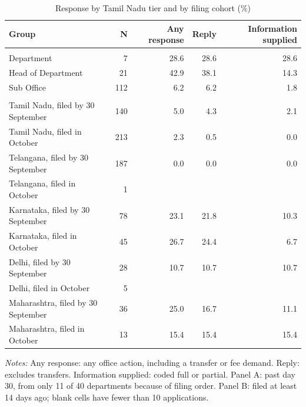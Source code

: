 \begin{table}[!htbp]
\centering
\caption{Response by Tamil Nadu tier and by filing cohort (\%)}
\label{tab:tab_cuts}
\small
\begin{threeparttable}
\begin{tabular}{lrrrr}
\toprule
Group & N & Any response & Reply & Information supplied \\
\midrule
\addlinespace\multicolumn{5}{l}{\textit{Panel A. Tamil Nadu by tier, by day 30}} \\
Department & 7 & 28.6 & 28.6 & 28.6 \\
Head of Department & 21 & 42.9 & 38.1 & 14.3 \\
Sub Office & 112 & 6.2 & 6.2 & 1.8 \\
\addlinespace\multicolumn{5}{l}{\textit{Panel B. By filing cohort, by day 14}} \\
Tamil Nadu, filed by 30 September & 140 & 5.0 & 4.3 & 2.1 \\
Tamil Nadu, filed in October & 213 & 2.3 & 0.5 & 0.0 \\
Telangana, filed by 30 September & 187 & 0.0 & 0.0 & 0.0 \\
Telangana, filed in October & 1 &  &  &  \\
Karnataka, filed by 30 September & 78 & 23.1 & 21.8 & 10.3 \\
Karnataka, filed in October & 45 & 26.7 & 24.4 & 6.7 \\
Delhi, filed by 30 September & 28 & 10.7 & 10.7 & 10.7 \\
Delhi, filed in October & 5 &  &  &  \\
Maharashtra, filed by 30 September & 36 & 25.0 & 16.7 & 11.1 \\
Maharashtra, filed in October & 13 & 15.4 & 15.4 & 15.4 \\
\bottomrule
\end{tabular}
\begin{tablenotes}[flushleft]\footnotesize
\item \textit{Notes:} Any response: any office action, including a transfer or fee demand. Reply: excludes transfers. Information supplied: coded full or partial. Panel A: past day 30, from only 11 of 40 departments because of filing order. Panel B: filed at least 14 days ago; blank cells have fewer than 10 applications.
\end{tablenotes}
\end{threeparttable}
\end{table}
